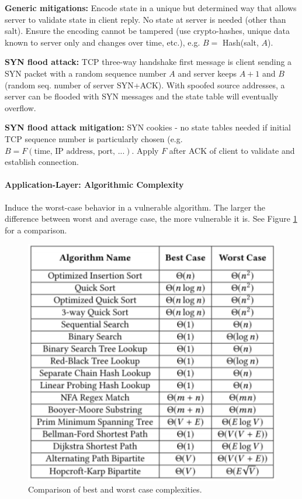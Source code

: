 \textbf{Generic mitigations:} Encode state in a unique but determined way that allows server to validate state in client reply. No state at server is needed (other than salt). Ensure the encoding cannot be tampered (use crypto-hashes, unique data known to server only and changes over time, etc.), e.g. $B =$ Hash(salt, $A$).

\textbf{SYN flood attack:} TCP three-way handshake first message is client sending a SYN packet with a random sequence number $A$ and server keeps $A+1$ and $B$ (random seq. number of server SYN+ACK). With spoofed source addresses, a server can be flooded with SYN messages and the state table will eventually overflow.

\textbf{SYN flood attack mitigation:} SYN cookies - no state tables needed if initial TCP sequence number is particularly chosen (e.g. $B = F(\text{time, IP address, port, ...})$. Apply $F$ after ACK of client to validate and establish connection.

\paragraph{Application-Layer: Algorithmic Complexity}
Induce the worst-case behavior in a vulnerable algorithm. The larger the difference between worst and average case, the more vulnerable it is. See Figure \ref{fig:complex} for a comparison.

\begin{figure}[h]
	\centering
	\includegraphics[scale=0.7]{images/910-complex.PNG}
	\caption{Comparison of best and worst case complexities.}
	\label{fig:complex}
\end{figure}

